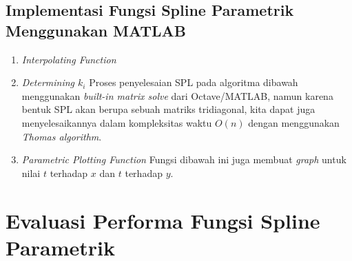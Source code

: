 \documentclass[journal,12pt,onecolumn,a4paper]{IEEEtran}
\begin{document}
\subsection{Implementasi Fungsi Spline Parametrik Menggunakan MATLAB}
\begin{enumerate}
	\item
	      \emph{Interpolating Function}
	      
	      \pagebreak
	\item
	      \emph{Determining \(k_i\)}
	      \newline
	      Proses penyelesaian SPL pada algoritma dibawah menggunakan \emph{built-in matrix solve} dari Octave/MATLAB, namun karena bentuk SPL akan berupa sebuah matriks tridiagonal, kita dapat juga menyelesaikannya dalam kompleksitas waktu \(O(n)\) dengan menggunakan \emph{Thomas algorithm}.
	      
	      \pagebreak
	\item
	      \emph{Parametric Plotting Function}
	      \newline
	      Fungsi dibawah ini juga membuat \emph{graph} untuk nilai \(t\) terhadap \(x\) dan \(t\) terhadap \(y\).
	      
\end{enumerate}

\section{Evaluasi Performa Fungsi Spline Parametrik}
\end{document}
